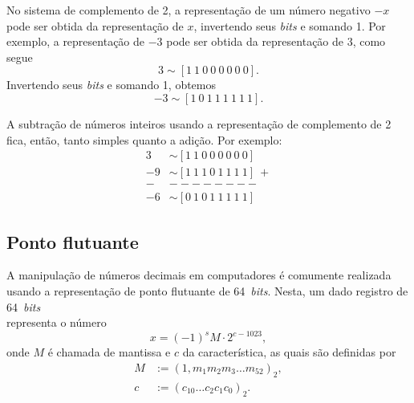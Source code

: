 No sistema de complemento de 2, a representação de um número negativo $-x$ pode ser obtida da representação de $x$, invertendo seus {\it bits} e somando 1. Por exemplo, a representação de $-3$ pode ser obtida da representação de $3$, como segue
\begin{equation}
  3 \sim [1 ~ 1 ~ 0 ~ 0 ~ 0 ~ 0 ~ 0 ~ 0].
\end{equation}
Invertendo seus {\it bits} e somando 1, obtemos
\begin{equation}
  -3 \sim [1 ~ 0 ~ 1 ~ 1 ~ 1 ~ 1 ~ 1 ~ 1].
\end{equation}

A subtração de números inteiros usando a representação de complemento de 2 fica, então, tanto simples quanto a adição. Por exemplo:
\begin{align}
  3 &\sim [1 ~ 1 ~ 0 ~ 0 ~ 0 ~ 0 ~ 0 ~ 0]\\
 -9 &\sim [1 ~ 1 ~ 1 ~ 0 ~ 1 ~ 1 ~ 1 ~ 1] ~ + \\
  - & -------- \\
 -6 &\sim [0 ~ 1 ~ 0 ~ 1 ~ 1 ~ 1 ~ 1 ~ 1]
\end{align}

\subsection{Ponto flutuante}

A manipulação de números decimais em computadores é comumente realizada usando a representação de ponto flutuante de 64~{\it bits}. Nesta, um dado registro de 64~{\it bits}
\begin{equation}
  [s ~ | ~ c_{10} ~ c_9 ~ \ldots ~ c_{0} ~ | ~ m_1 ~ m_2 ~ \ldots ~ m_{52}]
\end{equation}
representa o número
\begin{equation}
  x = (-1)^s M\cdot 2^{c - 1023},
\end{equation}
onde $M$ é chamada de mantissa e $c$ da característica, as quais são definidas por
\begin{align}
  M &:= (1,m_1m_2m_3\ldots m_{52})_2,\\
  c &:= (c_{10}\ldots c_2c_1c_0)_2.
\end{align}

